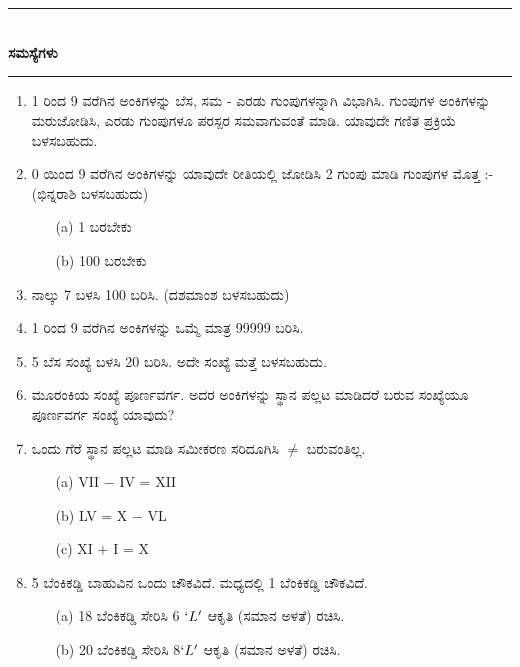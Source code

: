 \chapter[ಅಧ್ಯಾಯ 10]{}\label{chap10}


\begin{center}
\rule{5cm}{1pt}\\[5pt]
{\Large\bfseries ಸಮಸ್ಯೆಗಳು}\\[3pt]
\rule{5cm}{1pt}
\end{center}

\begin{enumerate}
\renewcommand{\labelenumi}{\bf\theenumi.}
\itemsep=5pt

\item 1 ರಿಂದ 9 ವರೆಗಿನ ಅಂಕಿಗಳನ್ನು ಬೆಸ, ಸಮ - ಎರಡು ಗುಂಪುಗಳನ್ನಾಗಿ ವಿಭಾಗಿಸಿ. ಗುಂಪುಗಳ ಅಂಕಿಗಳನ್ನು ಮರುಜೋಡಿಸಿ, ಎರಡು ಗುಂಪುಗಳೂ ಪರಸ್ಪರ ಸಮ\-ವಾಗುವಂತೆ ಮಾಡಿ. ಯಾವುದೇ ಗಣಿತ ಪ್ರಕ್ರಿಯೆ ಬಳಸಬಹುದು. 

\item 0 ಯಿಂದ 9 ವರೆಗಿನ ಅಂಕಿಗಳನ್ನು ಯಾವುದೇ ರೀತಿಯಲ್ಲಿ ಜೋಡಿಸಿ 2 ಗುಂಪು ಮಾಡಿ ಗುಂಪುಗಳ ಮೊತ್ತ :- (ಭಿನ್ನರಾಶಿ ಬಳಸಬಹುದು)
\begin{itemize}
\item[(a)] 1 ಬರಬೇಕು 
\item[(b)] 100 ಬರಬೇಕು 
\end{itemize}

\item ನಾಲ್ಕು 7 ಬಳಸಿ 100 ಬರಿಸಿ. (ದಶಮಾಂಶ ಬಳಸಬಹುದು)

\item 1 ರಿಂದ 9 ವರೆಗಿನ ಅಂಕಿಗಳನ್ನು ಒಮ್ಮೆ ಮಾತ್ರ 99999 ಬರಿಸಿ. 

\item 5 ಬೆಸ ಸಂಖ್ಯೆ ಬಳಸಿ 20 ಬರಿಸಿ. ಅದೇ ಸಂಖ್ಯೆ ಮತ್ತೆ ಬಳಸಬಹುದು. 

\item ಮೂರಂಕಿಯ ಸಂಖ್ಯೆ ಪೂರ್ಣವರ್ಗ. ಅದರ ಅಂಕಿಗಳನ್ನು ಸ್ಥಾನ ಪಲ್ಲಟ ಮಾಡಿದರೆ ಬರುವ ಸಂಖ್ಯೆಯೂ ಪೂರ್ಣವರ್ಗ ಸಂಖ್ಯೆ ಯಾವುದು? 

\item ಒಂದು ಗೆರೆ ಸ್ಥಾನ ಪಲ್ಲಟ ಮಾಡಿ ಸಮೀಕರಣ ಸರಿದೂಗಿಸಿ $\neq$ ಬರುವಂತಿಲ್ಲ. 
\begin{itemize}
\item[(a)] VII $-$ IV = XII
\item[(b)] LV = X $-$ VL
\item[(c)] XI $+$ I = X
\end{itemize}


\item 5 ಬೆಂಕಿಕಡ್ಡಿ ಬಾಹುವಿನ ಒಂದು ಚೌಕವಿದೆ. ಮಧ್ಯದಲ್ಲಿ 1 ಬೆಂಕಿಕಡ್ಡಿ  ಚೌಕವಿದೆ. 
\begin{itemize}
\item[(a)] 18 ಬೆಂಕಿಕಡ್ಡಿ ಸೇರಿಸಿ 6 $`L'$ ಆಕೃತಿ (ಸಮಾನ ಅಳತೆ) ರಚಿಸಿ. 
\item[(b)] 20 ಬೆಂಕಿಕಡ್ಡಿ ಸೇರಿಸಿ 8$`L'$ ಆಕೃತಿ (ಸಮಾನ ಅಳತೆ) ರಚಿಸಿ. 
\end{itemize}


\end{enumerate}
